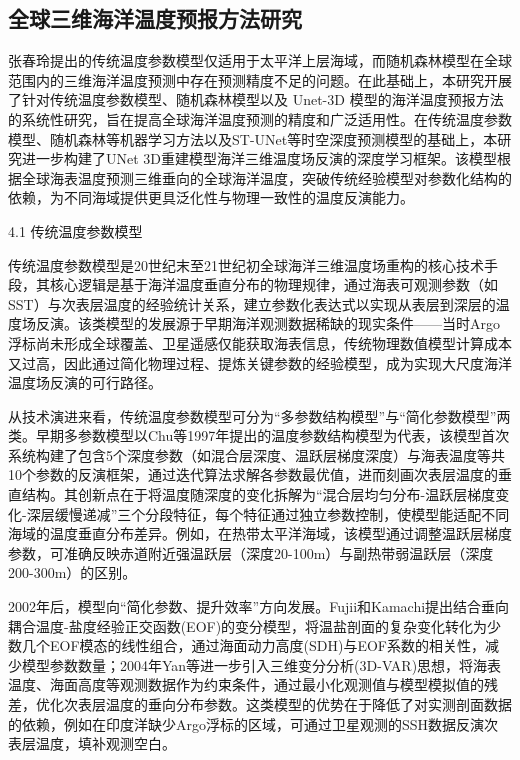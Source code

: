\documentclass[
  12pt,
]{article}
\begin{document}
\subsection{\texorpdfstring{
全球三维海洋温度预报方法研究}{ 全球三维海洋温度预报方法研究}}\label{ux5168ux7403ux4e09ux7ef4ux6d77ux6d0bux6e29ux5ea6ux9884ux62a5ux65b9ux6cd5ux7814ux7a76}

张春玲提出的传统温度参数模型仅适用于太平洋上层海域，而随机森林模型在全球范围内的三维海洋温度预测中存在预测精度不足的问题。在此基础上，本研究开展了针对传统温度参数模型、随机森林模型以及
Unet-3D
模型的海洋温度预报方法的系统性研究，旨在提高全球海洋温度预测的精度和广泛适用性。在传统温度参数模型、随机森林等机器学习方法以及ST-UNet等时空深度预测模型的基础上，本研究进一步构建了UNet
3D重建模型海洋三维温度场反演的深度学习框架。该模型根据全球海表温度预测三维垂向的全球海洋温度，突破传统经验模型对参数化结构的依赖，为不同海域提供更具泛化性与物理一致性的温度反演能力。

\protect{}\label{_Toc992953483}{}4.1 传统温度参数模型

传统温度参数模型是20世纪末至21世纪初全球海洋三维温度场重构的核心技术手段，其核心逻辑是基于海洋温度垂直分布的物理规律，通过海表可观测参数（如SST）与次表层温度的经验统计关系，建立参数化表达式以实现从表层到深层的温度场反演。该类模型的发展源于早期海洋观测数据稀缺的现实条件------当时Argo浮标尚未形成全球覆盖、卫星遥感仅能获取海表信息，传统物理数值模型计算成本又过高，因此通过简化物理过程、提炼关键参数的经验模型，成为实现大尺度海洋温度场反演的可行路径。

从技术演进来看，传统温度参数模型可分为``多参数结构模型''与``简化参数模型''两类。早期多参数模型以Chu等1997年提出的温度参数结构模型为代表，该模型首次系统构建了包含5个深度参数（如混合层深度、温跃层梯度深度）与海表温度等共10个参数的反演框架，通过迭代算法求解各参数最优值，进而刻画次表层温度的垂直结构。其创新点在于将温度随深度的变化拆解为``混合层均匀分布-温跃层梯度变化-深层缓慢递减''三个分段特征，每个特征通过独立参数控制，使模型能适配不同海域的温度垂直分布差异。例如，在热带太平洋海域，该模型通过调整温跃层梯度参数，可准确反映赤道附近强温跃层（深度20-100m）与副热带弱温跃层（深度200-300m）的区别。

2002年后，模型向``简化参数、提升效率''方向发展。Fujii和Kamachi提出结合垂向耦合温度-盐度经验正交函数(EOF)的变分模型，将温盐剖面的复杂变化转化为少数几个EOF模态的线性组合，通过海面动力高度(SDH)与EOF系数的相关性，减少模型参数数量；2004年Yan等进一步引入三维变分分析(3D-VAR)思想，将海表温度、海面高度等观测数据作为约束条件，通过最小化观测值与模型模拟值的残差，优化次表层温度的垂向分布参数。这类模型的优势在于降低了对实测剖面数据的依赖，例如在印度洋缺少Argo浮标的区域，可通过卫星观测的SSH数据反演次表层温度，填补观测空白。
\end{document}
